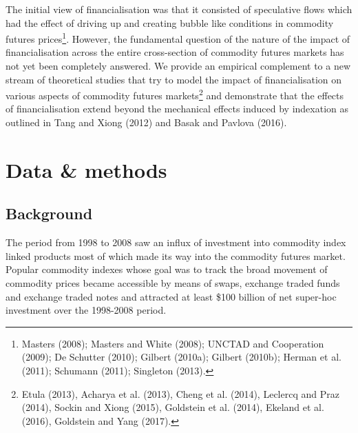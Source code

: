 \documentclass[]{elsarticle} %
\begin{document}
The initial view of financialisation was that it consisted of speculative flows which had the effect of driving up and creating bubble like conditions in commodity futures prices\footnote{Masters (2008); Masters and White (2008); UNCTAD and Cooperation (2009); De Schutter (2010); Gilbert (2010a); Gilbert (2010b); Herman et al. (2011); Schumann (2011); Singleton (2013).}. However, the fundamental question of the nature of the impact of financialisation across the entire cross-section of commodity futures markets has not yet been completely answered. We provide an empirical complement to a new stream of theoretical studies that try to model the impact of financialisation on various aspects of commodity futures markets\footnote{Etula (2013), Acharya et al. (2013), Cheng et al. (2014), Leclercq and Praz (2014), Sockin and Xiong (2015), Goldstein et al. (2014), Ekeland et al. (2016), Goldstein and Yang (2017).} and demonstrate that the effects of financialisation extend beyond the mechanical effects induced by indexation as outlined in Tang and Xiong (2012) and Basak and Pavlova (2016).

\newpage

\hypertarget{co-movement-data-methods}{%
\section{Data \& methods}\label{co-movement-data-methods}}

\hypertarget{co-movement-background}{%
\subsection{Background}\label{co-movement-background}}

The period from 1998 to 2008 saw an influx of investment into commodity index linked products most of which made its way into the commodity futures market. Popular commodity indexes whose goal was to track the broad movement of commodity prices became accessible by means of swaps, exchange traded funds and exchange traded notes and attracted at least \$100 billion of net super-hoc investment over the 1998-2008 period.

\medskip\setlength{\parindent}{0pt}
\end{document}
